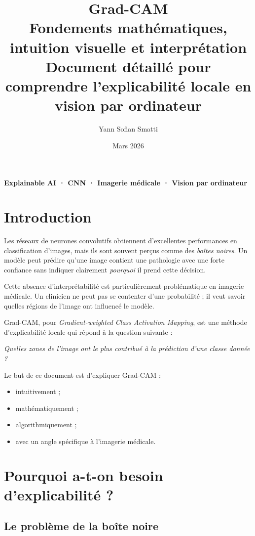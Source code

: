 ﻿\documentclass[11pt,a4paper]{article}
\title{\textbf{Grad-CAM}\\
Fondements mathématiques, intuition visuelle et interprétation\\
\large Document détaillé pour comprendre l'explicabilité locale en vision par ordinateur}
\author{Yann Sofian Smatti}
\date{Mars 2026}
\begin{document}
\maketitle

\begin{center}
\textbf{Explainable AI · CNN · Imagerie médicale · Vision par ordinateur}
\end{center}

\tableofcontents
\newpage

\section{Introduction}

Les réseaux de neurones convolutifs obtiennent d'excellentes performances en classification d'images, mais ils sont souvent perçus comme des \emph{boîtes noires}. Un modèle peut prédire qu'une image contient une pathologie avec une forte confiance sans indiquer clairement \emph{pourquoi} il prend cette décision.

Cette absence d'interprétabilité est particulièrement problématique en imagerie médicale. Un clinicien ne peut pas se contenter d'une probabilité ; il veut savoir quelles régions de l'image ont influencé le modèle.

Grad-CAM, pour \emph{Gradient-weighted Class Activation Mapping}, est une méthode d'explicabilité locale qui répond à la question suivante :

\begin{center}
\emph{Quelles zones de l'image ont le plus contribué à la prédiction d'une classe donnée ?}
\end{center}

Le but de ce document est d'expliquer Grad-CAM :
\begin{itemize}
    \item intuitivement ;
    \item mathématiquement ;
    \item algorithmiquement ;
    \item avec un angle spécifique à l'imagerie médicale.
\end{itemize}

\section{Pourquoi a-t-on besoin d'explicabilité ?}

\subsection{Le problème de la boîte noire}
\end{document}
